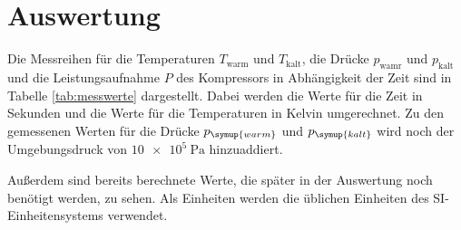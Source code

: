 \section{Auswertung}
\label{sec:Auswertung}
Die Messreihen für die Temperaturen $T_{\text{warm}}$ und $T_{\text{kalt}}$,
die Drücke $p_{\text{wamr}}$ und $p_{\text{kalt}}$ und die Leistungsaufnahme $P$ des Kompressors
in Abhängigkeit der Zeit sind in Tabelle \ref{tab:messwerte} dargestellt. Dabei
werden die Werte für die Zeit in Sekunden und die Werte für die Temperaturen in Kelvin
umgerechnet. Zu den gemessenen Werten für die Drücke $p_{\symup{warm}}$ und
$p_{\symup{kalt}}$ wird noch der Umgebungsdruck von $\SI{10e5}{\pascal}$ hinzuaddiert.

Außerdem sind bereits berechnete Werte,
die später in der Auswertung noch benötigt werden, zu sehen. Als Einheiten werden
die üblichen Einheiten des SI-Einheitensystems verwendet.

